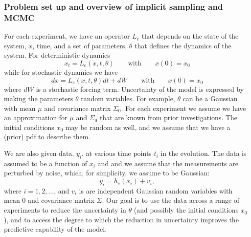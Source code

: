 \documentclass[11pt]{article}
\begin{document}
\subsubsection*{Problem set up and overview of implicit sampling and MCMC}
For each experiment,  we have an operator $L_e$ that depends on the state of the system, $x$, time,
and a set of parameters, $\theta$ that defines the dynamics of the system. For deterministic 
dynamics
\begin{equation}
\label{eq:ModelEquation}
x_t = L_e(x,t,\theta) \qquad \mathrm{with} \qquad x(0) = x_0
\end{equation}
while for stochastic dynamics we have
\[
dx = L_e(x,t,\theta) dt + dW \qquad \mathrm{with} \qquad x(0) = x_0
\]
where $dW$ is a stochastic forcing term. 
Uncertainty of the model is expressed by making the parameters $\theta$ random variables.
For example, $\theta$ can be a Gaussian with mean $\mu$ and covariance matrix $\Sigma_0$.
For each experiment we 
assume we have an approximation for $\mu$ and $\Sigma_0$ that are known from prior investigations.
The initial conditions $x_0$ may be random as well, and we assume that we have a (prior) pdf to describe them.

We are also given data, $y_i$, at various time points $t_i$ in the evolution.
The data is assumed to be a function of $x_i$ and
and we assume that the measurements are perturbed by noise, which, for simplicity, we assume to be Gaussian:
\begin{equation}
	\label{eq:DataEquation}
	y_i = h_e(x_i)+v_i,
\end{equation}
where $i=1,2,\dots$, and $v_i$ is are independent Gaussian random variables with mean $0$ and covariance matrix $\Sigma$.
Our goal is to use the data across a range of experiments to reduce the uncertainty in $\theta$ (and possibly the initial conditions $x_0$), and to 
access the degree to which the reduction in uncertainty improves the predictive capability of the model.
\end{document}
